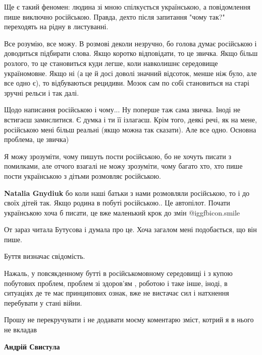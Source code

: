 \begin{itemize}

Ще є такий феномен: людина зі мною спілкується українською, а повідомлення пише
виключно російською. Правда, дехто після запитання "чому так?" переходять на
рідну в листуванні.


Все розумію, все можу. В розмові деколи незручно, бо голова думає російською і
доводиться підбирати слова. Якщо коротко відповідати, то це звичка. Якщо більш
розлого, то це становиться куди легше, коли навколишнє середовище україномовне.
Якщо ні (а це й досі доволі значний відсоток, менше ніж було, але все одно є),
то відбуваються рецидиви. Мозок сам по собі становиться на старі зручні рельси
і так далі.

Щодо написання російською і чому... Ну поперше таж сама звичка. Іноді не
встигаєш замислитися. Є думка і ти її ізлагаєш. Крім того, деякі речі, як на
мене, російською мені більш реальні (якщо можна так сказати). Але все одно.
Основна проблема, це звичка)



Я можу зрозуміти, чому пишуть пости російською, бо не хочуть писати з
помилками, але отчого взагалі не можу зрозуміти, чому багато хто, хто пише
пости українською з дітьми розмовляє російською.

\begin{itemize} %
\textbf{Natalia Gnydiuk} бо коли наші батьки з нами розмовляли російською, то і до своїх дітей так. Якщо родина в побуті російською.. Це автопілот. Почати українською хоча б писати, це вже маленький крок до змін  @igg{fbicon.smile} 
\end{itemize} %

От зараз читала Бутусова і думала про це. Хоча загалом мені подобається, що він пише.

Буття визначає свідомість.

Нажаль, у повсякденному бутті в російськомовному середовищі і з купою побутових
проблем, проблем зі здоров'ям , роботою і таке інше, іноді, в ситуаціях де те
має принципових ознак, вже не вистачає сил і натхнення перебувати у стані
війни.

Прошу не перекручувати і не додавати моєму коментарю зміст, котрий я в нього не
вкладав

\begin{itemize} %
\textbf{Андрій Свистула} 


\end{itemize}
\end{itemize}
